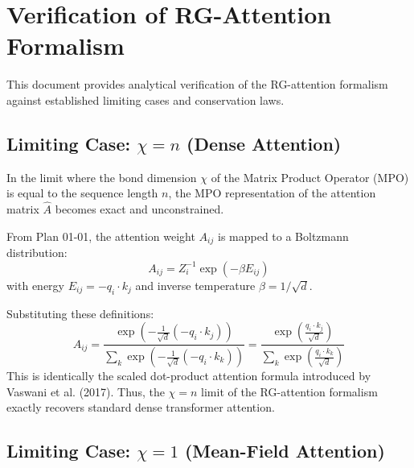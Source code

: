 
\section{Verification of RG-Attention Formalism}

This document provides analytical verification of the RG-attention formalism against established limiting cases and conservation laws.

\subsection{Limiting Case: $\chi = n$ (Dense Attention)}

In the limit where the bond dimension $\chi$ of the Matrix Product Operator (MPO) is equal to the sequence length $n$, the MPO representation of the attention matrix $\hat{A}$ becomes exact and unconstrained.

From Plan 01-01, the attention weight $A_{ij}$ is mapped to a Boltzmann distribution:
\begin{equation}
    A_{ij} = Z_i^{-1} \exp(-\beta E_{ij})
\end{equation}
with energy $E_{ij} = -q_i \cdot k_j$ and inverse temperature $\beta = 1/\sqrt{d}$.

Substituting these definitions:
\begin{equation}
    A_{ij} = \frac{\exp\left( -\frac{1}{\sqrt{d}} (-q_i \cdot k_j) \right)}{\sum_{k} \exp\left( -\frac{1}{\sqrt{d}} (-q_i \cdot k_k) \right)} = \frac{\exp\left( \frac{q_i \cdot k_j}{\sqrt{d}} \right)}{\sum_{k} \exp\left( \frac{q_i \cdot k_k}{\sqrt{d}} \right)}
\end{equation}
This is identically the scaled dot-product attention formula introduced by Vaswani et al. (2017). Thus, the $\chi = n$ limit of the RG-attention formalism exactly recovers standard dense transformer attention.

\subsection{Limiting Case: $\chi = 1$ (Mean-Field Attention)}

